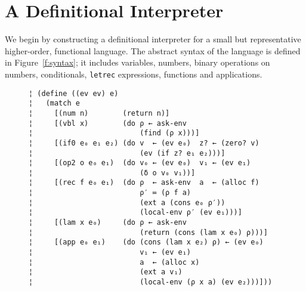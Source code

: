 \section{A Definitional Interpreter}\label{s:interp}

We begin by constructing a definitional interpreter for a small but
representative higher-order, functional language.  The abstract syntax
of the language is defined in Figure~\ref{f:syntax}; it includes variables,
numbers, binary operations on numbers, conditionals, {\tt letrec} expressions,
functions and applications.

\begin{figure} %
\begin{mdframed}
\begin{lstlisting}
¦ (define ((ev ev) e)
¦   (match e
¦     [(num n)        (return n)]
¦     [(vbl x)        (do ρ ← ask-env
¦                         (find (ρ x)))]    
¦     [(if0 e₀ e₁ e₂) (do v  ← (ev e₀)  z? ← (zero? v)
¦                         (ev (if z? e₁ e₂)))]
¦     [(op2 o e₀ e₁)  (do v₀ ← (ev e₀)  v₁ ← (ev e₁)
¦                         (δ o v₀ v₁))]
¦     [(rec f e₀ e₁)  (do ρ  ← ask-env  a  ← (alloc f)
¦                         ρ′ ≔ (ρ f a)
¦                         (ext a (cons e₀ ρ′))
¦                         (local-env ρ′ (ev e₁)))]
¦     [(lam x e₀)     (do ρ ← ask-env
¦                         (return (cons (lam x e₀) ρ)))]
¦     [(app e₀ e₁)    (do (cons (lam x e₂) ρ) ← (ev e₀)
¦                         v₁ ← (ev e₁)
¦                         a  ← (alloc x)
¦                         (ext a v₁)
¦                         (local-env (ρ x a) (ev e₂)))]))
\end{lstlisting}
\label{f:interpreter}
\end{mdframed}
\end{figure} %

